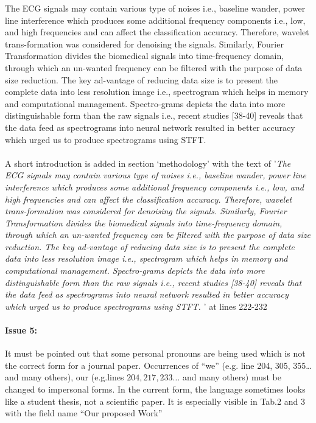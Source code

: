 \documentclass{article}
\begin{document}
The ECG signals may contain various type of noises i.e., baseline wander, power line interference which produces some additional frequency components i.e., low, and high frequencies and can affect the classification accuracy. Therefore, wavelet trans-formation was considered for denoising the signals. Similarly, Fourier Transformation divides the biomedical signals into time-frequency domain, through which an un-wanted frequency can be filtered with the purpose of data size reduction. The key ad-vantage of reducing data size is to present the complete data into less resolution image i.e., spectrogram which helps in memory and computational management. Spectro-grams depicts the data into more distinguishable form than the raw signals i.e., recent studies [38-40] reveals that the data feed as spectrograms into neural network resulted in better accuracy which urged us to produce spectrograms using STFT.  \\\\

A short introduction is added in section `methodology' with the text of '\textit{The ECG signals may contain various type of noises i.e., baseline wander, power line interference which produces some additional frequency components i.e., low, and high frequencies and can affect the classification accuracy. Therefore, wavelet trans-formation was considered for denoising the signals. Similarly, Fourier Transformation divides the biomedical signals into time-frequency domain, through which an un-wanted frequency can be filtered with the purpose of data size reduction. The key ad-vantage of reducing data size is to present the complete data into less resolution image i.e., spectrogram which helps in memory and computational management. Spectro-grams depicts the data into more distinguishable form than the raw signals i.e., recent studies [38-40] reveals that the data feed as spectrograms into neural network resulted in better accuracy which urged us to produce spectrograms using STFT. }' at lines 222-232

\paragraph{Issue 5:}
\begin{displayquote}
It must be pointed out that some personal pronouns are being used which is not the correct form for a journal paper. Occurrences of “we” (e.g. line 204, 305, 355…and many others), our (e.g.lines $204,217,233 \ldots$ and many others) must be changed to impersonal forms.  In the current form, the language sometimes looks like a student thesis, not a scientific paper. It is especially visible in Tab.2 and 3 with the field name “Our proposed Work”
\end{displayquote}
\end{document}
